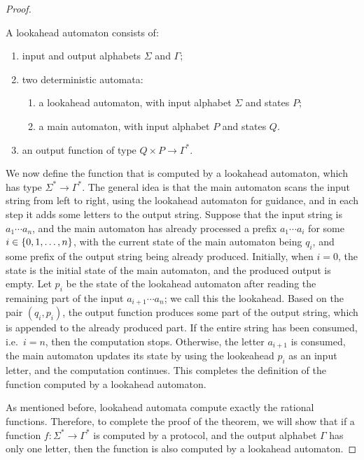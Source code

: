 \begin{proof}
\begin{definition}\label{def:bimachine}
  A lookahead automaton consists of:
  \begin{enumerate}
    \item input and output alphabets $\Sigma$ and $\Gamma$;
    \item two deterministic automata: 
    \begin{enumerate}
      \item a lookahead automaton, with input alphabet $\Sigma$ and states $P$;
      \item a main automaton, with input alphabet $P$ and states $Q$.
    \end{enumerate}
    \item an output function of type $Q \times P \to \Gamma^*$. 
  \end{enumerate}
\end{definition}
We now define the function that is computed by a lookahead automaton, which has type  $\Sigma^* \to \Gamma^*$. The general idea is that the main automaton scans the input string from left to right, using the lookahead automaton for guidance, and in each step it adds some letters to  the  output string.  Suppose that the input string is $a_1 \cdots a_n$, and the main automaton has already processed a prefix $a_1 \cdots a_i$ for some $i \in \{0,1,\ldots,n\}$, with the current state of the main automaton  being $q_i$, and some prefix of the output string being already produced. Initially, when $i=0$, the state is the initial state of the main automaton, and the produced output is empty.  Let $p_i$ be the state of the lookahead automaton after reading the remaining part of the input $a_{i+1} \cdots a_n$; we call this the lookahead. Based on the pair $(q_i,p_i)$, the output function produces some part of the output string, which is appended to the already produced part. If the entire string has been consumed, i.e.~$i=n$, then the computation stops. Otherwise, the letter $a_{i+1}$ is consumed, the main automaton updates its state by using the lookeahead $p_i$ as an input letter, and the computation continues.  This completes the definition of the function computed by a lookahead automaton. 

As mentioned before,
lookahead automata compute exactly the rational functions. Therefore, to complete the proof of the theorem, we will show that if a function $f : \Sigma^* \to \Gamma^*$ is computed by a protocol, and the output alphabet $\Gamma$ has only one letter, then the function is also computed by a lookahead automaton. 


\end{proof}
